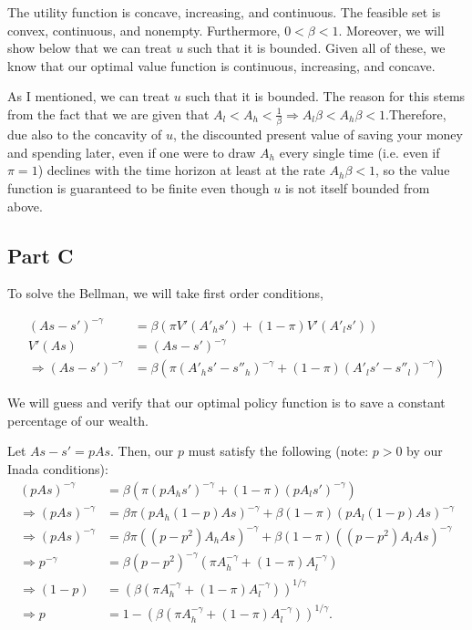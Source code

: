 \documentclass[11pt]{article} %
\begin{document}

The utility function is concave, increasing, and continuous. The feasible set is convex, continuous, and nonempty. Furthermore, $0<\beta<1$. Moreover, we will show below that we can treat $u$ such that it is bounded. Given all of these, we know that our optimal value function is continuous, increasing, and concave.

As I mentioned, we can treat $u$ such that it is bounded. The reason for this stems from the fact that we are given that $A_l<A_h<\frac{1}{\beta} \Rightarrow A_l \beta < A_h \beta <1$.Therefore, due also to the concavity of $u$, the discounted present value of saving your money and spending later, even if one were to draw $A_h$ every single time (i.e. even if $\pi=1$) declines with the time horizon at least at the rate $A_h \beta <1$, so the value function is guaranteed to be finite even though $u$ is not itself bounded from above. 

\subsection{Part C}
To solve the Bellman, we will take first order conditions, 

\begin{align*}
(As - s')^{-\gamma}&= \beta(\pi V'(A'_hs') + (1-\pi)V'(A'_l s'))\\
V'(As) &= (As -s')^{-\gamma}\\
\Rightarrow (As - s')^{-\gamma}&= \beta(\pi (A'_hs'-s''_h)^{-\gamma} + (1-\pi)(A'_l s'-s''_l)^{-\gamma})
\end{align*}

We will guess and verify that our optimal policy function is to save a constant percentage of our wealth.

Let $As-s' = pAs$. Then, our $p$ must satisfy the following (note: $p>0$ by our Inada conditions):
\begin{align*}
(pAs)^{-\gamma} &= \beta(\pi (pA_hs')^{-\gamma} + (1-\pi)(pA_ls')^{-\gamma} )\\
\Rightarrow (pAs)^{-\gamma} &= \beta \pi (pA_h(1-p)As)^{-\gamma} + \beta (1-\pi) (pA_l(1-p)As)^{-\gamma}\\
\Rightarrow  (pAs)^{-\gamma} &= \beta \pi ((p - p^2)A_hAs)^{-\gamma} + \beta (1-\pi) ((p - p^2)A_lAs)^{-\gamma} \\
\Rightarrow p^{-\gamma} &= \beta (p - p^2)^{-\gamma} (\pi A_h^{-\gamma} + (1-\pi) A_l^{-\gamma})\\
\Rightarrow (1-p) &= (\beta (\pi A_h^{-\gamma} + (1-\pi) A_l^{-\gamma}))^{1/\gamma} \\
\Rightarrow p &= 1 - (\beta (\pi A_h^{-\gamma} + (1-\pi) A_l^{-\gamma}))^{1/\gamma}.
\end{align*}
\end{document}
